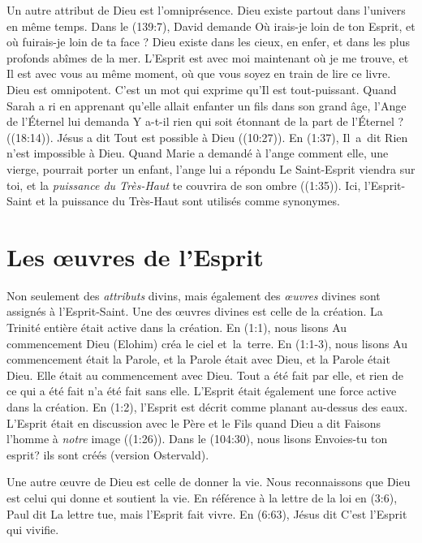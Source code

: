 Un autre attribut de Dieu est l'omniprésence. Dieu existe partout dans
 l'univers en même temps. Dans le (139:7), David demande\frcolon{}
 \Og Où irais-je loin de ton Esprit, et où fuirais-je loin de ta face ? \Fg{}
 Dieu existe dans les cieux, en enfer, et dans les plus profonds abîmes de
 la mer. L'Esprit est avec moi maintenant où je me trouve, et Il est avec vous
 au même moment, où que vous soyez en train de lire ce livre. Dieu est omnipotent.
 C'est un mot qui exprime qu'Il est tout-puissant. Quand Sarah a ri en apprenant
 qu'elle allait enfanter un fils dans son grand âge, l'Ange de l'Éternel lui demanda\frcolon{}
 \Og Y a-t-il rien qui soit étonnant de la part de l'Éternel ? \Fg{}
 ((18:14)). Jésus a dit\frcolon{} \Og Tout est possible à Dieu \Fg{}
 ((10:27)). En (1:37), Il~a~dit\frcolon{}
 \Og Rien n'est impossible à Dieu. \Fg{} Quand Marie a demandé à l'ange comment
 elle, une vierge, pourrait porter un enfant, l'ange lui a répondu\frcolon{}
 \Og Le Saint-Esprit viendra sur toi, et la \emph{puissance du Très-Haut} te couvrira
 de son ombre \Fg{} ((1:35)). Ici, l'Esprit-Saint et
 la puissance du Très-Haut sont utilisés comme synonymes.

\section{Les \oe{}uvres de l'Esprit}

Non seulement des \emph{attributs} divins, mais également des \emph{\oe{}uvres}
 divines sont assignés à l'Esprit-Saint.
 Une des œuvres divines est celle de la création.
 La Trinité entière était active dans la création.
 En (1:1), nous lisons\frcolon{}
 \Og Au commencement Dieu (Elohim) créa le ciel et~la~terre. \Fg{}
 En (1:1-3), nous lisons\frcolon{}
 \Og Au commencement était la Parole, et la Parole était avec Dieu,
 et la Parole était Dieu. Elle était au commencement avec Dieu.
 Tout a été fait par elle, et rien de ce qui a été fait n'a été fait
 sans elle. \Fg{}
 L'Esprit était également une force active dans la création.
 En (1:2), l'Esprit est décrit comme planant au-dessus
 des eaux. L'Esprit était en discussion avec le Père et le Fils quand
 Dieu a dit\frcolon{} \Og Faisons l'homme à \emph{notre} image \Fg{} ((1:26)).
 Dans le (104:30), nous lisons\frcolon{}
 \Og Envoies-tu ton esprit? ils sont créés \Fg{} (version Ostervald).

Une autre œuvre de Dieu est celle de donner la vie. Nous reconnaissons que Dieu
 est celui qui donne et soutient la vie.
 En référence à la lettre de la loi en (3:6),
 Paul dit\frcolon{} \Og La lettre tue, mais l'Esprit fait vivre. \Fg{}
 En (6:63), Jésus dit\frcolon{} \Og C'est l'Esprit qui vivifie.\Fg{}

